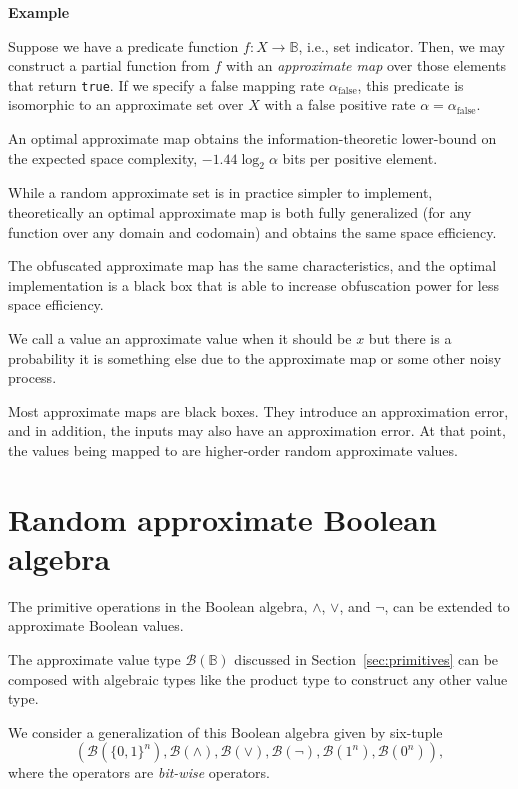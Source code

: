 \documentclass[11pt,final,hidelinks]{article}
\newcommand{\FPR}{\alpha}          %
\newcommand{\Bool}{\mathbb{B}}     %
\newcommand{\Ber}[1]{\mathcal{B}(#1)}  %
\theoremstyle{plain}
\newcounter{examplecounter}
\newenvironment{example}
{
    \refstepcounter{examplecounter}%
    \par\vspace{\baselineskip}\noindent
    \textbf{Example \theexamplecounter}%
    \begin{itshape}
    \quad
}
{
    \end{itshape}
    \par\vspace{\baselineskip}%
    \noindent\ignorespacesafterend
}
\newenvironment{remark}
  {\pushQED{\qed}\renewcommand{\qedsymbol}{$\triangle$}\remarkx}
  {\popQED\endremarkx}
\begin{document}
\begin{example}
Suppose we have a predicate function $f : X \to \Bool$, i.e., set indicator.
Then, we may construct a partial function from $f$ with an \emph{approximate map} over those elements that return \texttt{true}.
If we specify a false mapping rate $\FPR_{\text{false}}$, this predicate is isomorphic to an approximate set over $X$ with a false positive rate $\FPR = \FPR_{\text{false}}$.

An optimal approximate map obtains the information-theoretic lower-bound on the expected space complexity, $-1.44 \log_2 \FPR$ bits per positive element.

While a random approximate set is in practice simpler to implement, theoretically an optimal approximate map is both fully generalized (for any function over any domain and codomain) and obtains the same space efficiency.

The obfuscated approximate map has the same characteristics, and the optimal implementation is a black box that is able to increase obfuscation power for less space efficiency.
\end{example}

\begin{remark}
We call a value an approximate value when it should be $x$ but there is a probability it is something else due to the approximate map or some other noisy process.
\end{remark}

Most approximate maps are black boxes.
They introduce an approximation error, and in addition, the inputs may also have an approximation error. At that point, the values being mapped to are higher-order random approximate values.

\section{Random approximate Boolean algebra}
\label{sec:confusion}

The primitive operations in the Boolean algebra, $\land$, $\lor$, and $\neg$, can be extended to approximate Boolean values.

The approximate value type $\Ber{\Bool}$ discussed in Section~\ref{sec:primitives} can be composed with algebraic types like the product type to construct any other value type.

We consider a generalization of this Boolean algebra given by six-tuple
\begin{equation}
\left(\Ber{\{0,1\}^n}, \Ber{\land}, \Ber{\lor}, \Ber{\neg}, \Ber{1^n}, \Ber{0^n}\right),
\end{equation}
where the operators are \emph{bit-wise} operators.
\end{document}
